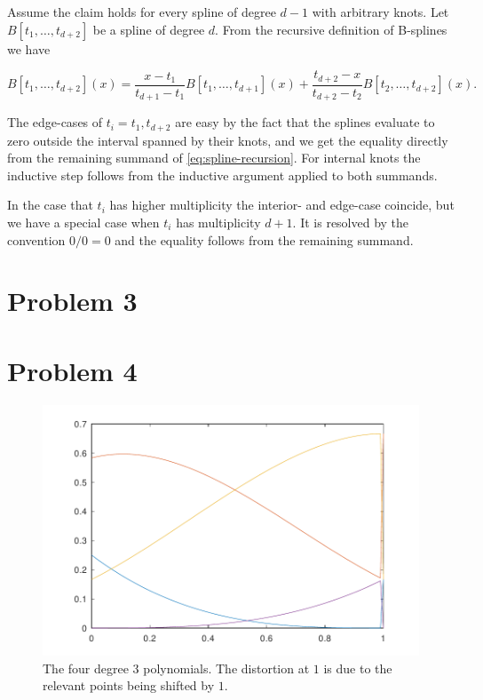 \documentclass{article}
\begin{document}
Assume the claim holds for every spline of degree $d - 1$ with arbitrary knots.
Let $B[t_1,\ldots, t_{d + 2}]$ be a spline of degree $d$.
From the recursive definition of B-splines we have

\begin{equation} \label{eq:spline-recursion}
    B[t_1,\ldots, t_{d + 2}](x)
    = \frac {x - t_1}{t_{d + 1} - t_1}B[t_1,\ldots,t_{d + 1}](x)
    + \frac {t_{d + 2} - x}{t_{d + 2} - t_2}B[t_2,\ldots,t_{d + 2}](x).
\end{equation}

The edge-cases of $t_i=t_1,t_{d + 2}$ are easy by the fact that the splines evaluate to zero
outside the interval spanned by their knots, and we get the equality directly from the remaining 
summand of \autoref{eq:spline-recursion}.
For internal knots the inductive step follows from the inductive argument applied to both summands.

In the case that $t_i$ has higher multiplicity the interior- and edge-case coincide,
but we have a special case when $t_i$ has multiplicity $d + 1$.
It is resolved by the convention $0/0=0$ and the equality follows from the remaining summand. 

\section*{Problem 3}



\section*{Problem 4}




\begin{figure}
    \centering
    \includegraphics[width=\linewidth]{figures/plotSplines.pdf}
    \caption{The four degree $3$ polynomials. The distortion at $1$ is due to the relevant points being shifted by $1$.}
\end{figure}
\end{document}
